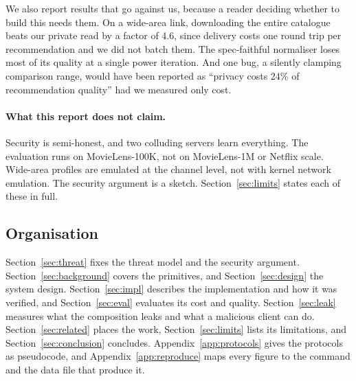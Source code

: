 We also report results that go against us, because a reader deciding whether to
build this needs them. On a wide-area link, downloading the entire catalogue
beats our private read by a factor of 4.6, since delivery costs one round trip
per recommendation and we did not batch them. The spec-faithful normaliser loses
most of its quality at a single power iteration. And one bug, a silently
clamping comparison range, would have been reported as ``privacy costs 24\% of
recommendation quality'' had we measured only cost.

\paragraph{What this report does not claim.} Security is semi-honest, and two
colluding servers learn everything. The evaluation runs on MovieLens-100K, not
on MovieLens-1M or Netflix scale. Wide-area profiles are emulated at the channel
level, not with kernel network emulation. The security argument is a sketch.
Section~\ref{sec:limits} states each of these in full.

\subsection{Organisation}
\label{sec:intro:org}

Section~\ref{sec:threat} fixes the threat model and the security argument.
Section~\ref{sec:background} covers the primitives, and
Section~\ref{sec:design} the system design. Section~\ref{sec:impl} describes the
implementation and how it was verified, and Section~\ref{sec:eval} evaluates its
cost and quality. Section~\ref{sec:leak} measures what the composition leaks and
what a malicious client can do. Section~\ref{sec:related} places the work,
Section~\ref{sec:limits} lists its limitations, and
Section~\ref{sec:conclusion} concludes. Appendix~\ref{app:protocols} gives the
protocols as pseudocode, and Appendix~\ref{app:reproduce} maps every figure to
the command and the data file that produce it.
